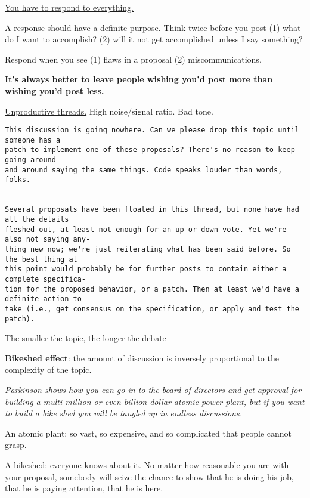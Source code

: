 \documentclass[landscape,30pt]{foils}
\begin{document}


\underline{You have to respond to everything.}

A response should have a definite purpose.  Think twice before you post (1) what do I want to accomplish? (2) will it not get accomplished unless I say something?

Respond when you see (1) flaws in a proposal (2) miscommunications.

{\bf It's always better to leave people wishing you'd post more than wishing you'd post less.}

\underline{Unproductive threads.}  High noise/signal ratio.  Bad tone.

{\small
\begin{verbatim}
This discussion is going nowhere. Can we please drop this topic until someone has a
patch to implement one of these proposals? There's no reason to keep going around
and around saying the same things. Code speaks louder than words, folks.


Several proposals have been floated in this thread, but none have had all the details
fleshed out, at least not enough for an up-or-down vote. Yet we're also not saying any-
thing new now; we're just reiterating what has been said before. So the best thing at
this point would probably be for further posts to contain either a complete specifica-
tion for the proposed behavior, or a patch. Then at least we'd have a definite action to
take (i.e., get consensus on the specification, or apply and test the patch).
\end{verbatim}
}

\underline{The smaller the topic, the longer the debate}

{\bf Bikeshed effect}: the amount of discussion is inversely proportional to the complexity of the topic.

{\em Parkinson shows how you can go in to the board of directors and get approval for building a multi-million or even billion dollar atomic power plant, but if you want to build a bike shed you will be tangled up in endless discussions.}

An atomic plant: so vast, so expensive, and so complicated that people cannot grasp.

A bikeshed: everyone knows about it.  No matter how reasonable you are with your proposal, somebody will seize the chance to show
that he is doing his job, that he is paying attention, that he is here.
\end{document}
